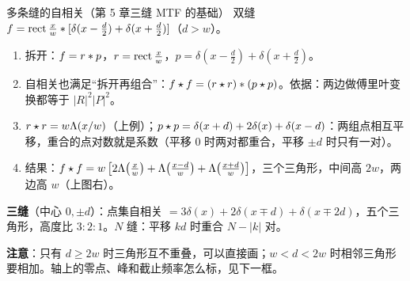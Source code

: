 \begin{exam}{多条缝的自相关（第 5 章三缝 MTF 的基础）}
双缝 $f=\operatorname{rect}\frac xw\ast[\delta(x-\frac d2)+\delta(x+\frac d2)]$（$d>w$）。
\begin{enumerate}
\item 拆开：$f=r\ast p$，$r=\operatorname{rect}\frac xw$，$p=\delta(x-\frac d2)+\delta(x+\frac d2)$。
\item 自相关也满足“拆开再组合”：$f\star f=(r\star r)\ast(p\star p)$。依据：两边做傅里叶变换都等于 $|R|^2|P|^2$。
\item $r\star r=w\Lambda(x/w)$（上例）；$p\star p=\delta(x+d)+2\delta(x)+\delta(x-d)$：两组点相互平移，重合的点对数就是系数（平移 0 时两对都重合，平移 $\pm d$ 时只有一对）。
\item 结果：$f\star f=w\left[2\Lambda\!\left(\frac xw\right)+\Lambda\!\left(\frac{x-d}w\right)+\Lambda\!\left(\frac{x+d}w\right)\right]$，三个三角形，中间高 $2w$，两边高 $w$（上图右）。
\end{enumerate}

\textbf{三缝}（中心 $0,\pm d$）：点集自相关 $=3\delta(x)+2\delta(x\mp d)+\delta(x\mp2d)$，五个三角形，高度比 $3:2:1$。$N$ 缝：平移 $kd$ 时重合 $N-|k|$ 对。

\textbf{注意}：只有 $d\ge 2w$ 时三角形互不重叠，可以直接画；$w<d<2w$ 时相邻三角形要相加。轴上的零点、峰和截止频率怎么标，见下一框。
\end{exam}

